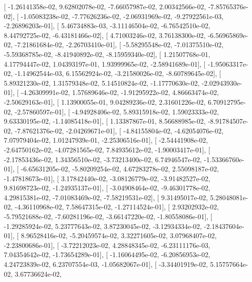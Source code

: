 \documentclass{article}
\begin{document}
       [ -1.26141358e-02,   9.62802078e-02,  -7.66057987e-02,
          2.00342566e-02,  -7.85765376e-02],
       [ -1.05083238e-02,  -7.77626236e-02,  -2.06931969e-02,
         -9.27922561e-03,  -2.26896203e-01],
       [  5.46734883e-03,  -3.11146504e-02,  -6.76542510e-02,
          8.44792725e-02,  -6.43181466e-02],
       [  4.71003246e-02,   3.76138300e-02,  -6.56965869e-02,
         -7.21861684e-02,  -2.26703410e-01],
       [ -5.58295548e-02,  -7.01375510e-02,  -5.59368785e-02,
         -8.41940892e-02,  -8.15959340e-02],
       [  1.21507768e-01,   4.17794447e-02,   1.04393197e-01,
          1.93999965e-02,  -2.58941689e-01],
       [ -1.95063317e-02,  -1.14962544e-03,   6.15562924e-02,
         -3.21580026e-02,  -8.60789645e-02],
       [  5.89321230e-02,   1.31579348e-02,   5.14510824e-02,
         -1.17770630e-02,  -2.02943930e-01],
       [ -4.26309991e-02,   1.57689646e-02,  -1.91295922e-02,
          4.86663474e-02,  -2.50629163e-01],
       [  1.13900055e-01,   9.04289236e-02,   2.31601226e-02,
          6.70912795e-02,  -2.57860597e-01],
       [ -4.94928406e-02,   5.89315918e-02,   1.59023333e-02,
          9.63330195e-02,  -1.14085418e-01],
       [  1.13387867e-01,   8.56688985e-02,  -8.91784507e-02,
         -7.87621376e-02,  -2.04269671e-01],
       [ -4.84155804e-02,  -4.62054076e-02,   7.07979404e-02,
          1.01247939e-01,  -2.25306516e-01],
       [ -2.54441908e-02,  -2.64750162e-02,  -4.07281565e-02,
          7.84935612e-02,  -1.90003417e-01],
       [ -2.17853436e-02,   1.34356510e-02,  -3.73213400e-02,
          6.74946547e-02,  -1.53366760e-01],
       [ -6.65631205e-02,  -5.80209254e-02,   4.67283278e-02,
          2.55098187e-02,  -1.47818673e-01],
       [  3.17842440e-02,  -3.08126779e-02,  -3.91482527e-02,
          9.81698723e-02,  -1.24935137e-01],
       [ -3.04908464e-02,  -9.46301778e-02,   4.29815381e-02,
         -7.01083469e-02,  -7.58219531e-02],
       [  9.31495017e-02,   5.28048081e-02,  -4.36110968e-02,
          7.58647315e-02,  -1.27114524e-01],
       [  2.93202932e-02,  -5.79521688e-02,  -7.60281196e-02,
         -3.66147220e-02,  -1.80558086e-01],
       [ -1.29285924e-02,   5.23777643e-02,   3.87230045e-02,
         -3.12934334e-02,  -2.18437604e-01],
       [  8.96528416e-02,  -5.20459574e-02,   3.32271605e-02,
          3.07968407e-02,  -2.23800686e-01],
       [ -3.72212023e-02,   4.28848345e-02,  -6.23111176e-03,
          7.04354642e-02,  -1.73654289e-01],
       [ -1.16064495e-02,  -6.20856953e-02,   4.24723839e-02,
          6.23707554e-03,  -1.05682067e-01],
       [ -3.34401919e-02,   5.15757664e-02,   3.67736624e-02,
\end{document}
